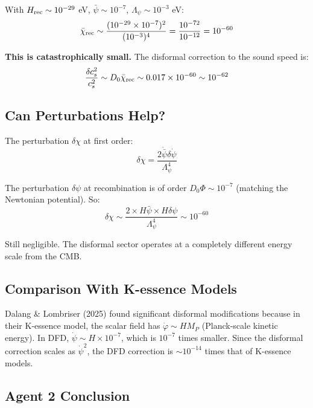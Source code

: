 \documentclass[11pt,a4paper]{article}
\begin{document}
With $H_{\rm rec} \sim 10^{-29}$ eV, $\bar{\psi} \sim 10^{-7}$, $\Lambda_\psi \sim 10^{-3}$ eV:
\begin{equation}
\bar{\chi}_{\rm rec} \sim \frac{(10^{-29} \times 10^{-7})^2}{(10^{-3})^4} = \frac{10^{-72}}{10^{-12}} = 10^{-60}
\end{equation}

\textbf{This is catastrophically small.} The disformal correction to the sound speed is:
\begin{equation}
\frac{\delta c_s^2}{c_s^2} \sim D_0\bar{\chi}_{\rm rec} \sim 0.017 \times 10^{-60} \sim 10^{-62}
\end{equation}

\subsection{Can Perturbations Help?}

The perturbation $\delta\chi$ at first order:
\begin{equation}
\delta\chi = \frac{2\dot{\bar{\psi}}\delta\dot{\psi}}{\Lambda_\psi^4}
\end{equation}

The perturbation $\delta\psi$ at recombination is of order $D_0\Phi \sim 10^{-7}$ (matching the Newtonian potential). So:
\begin{equation}
\delta\chi \sim \frac{2 \times H\bar{\psi} \times H\delta\psi}{\Lambda_\psi^4} \sim 10^{-60}
\end{equation}

Still negligible. The disformal sector operates at a completely different energy scale from the CMB.

\subsection{Comparison With K-essence Models}

Dalang \& Lombriser (2025) found significant disformal modifications because in their K-essence model, the scalar field has $\dot{\varphi} \sim H M_P$ (Planck-scale kinetic energy). In DFD, $\dot{\psi} \sim H \times 10^{-7}$, which is $10^{-7}$ times smaller. Since the disformal correction scales as $\dot{\psi}^2$, the DFD correction is $\sim 10^{-14}$ times that of K-essence models.

\subsection{Agent 2 Conclusion}
\end{document}
